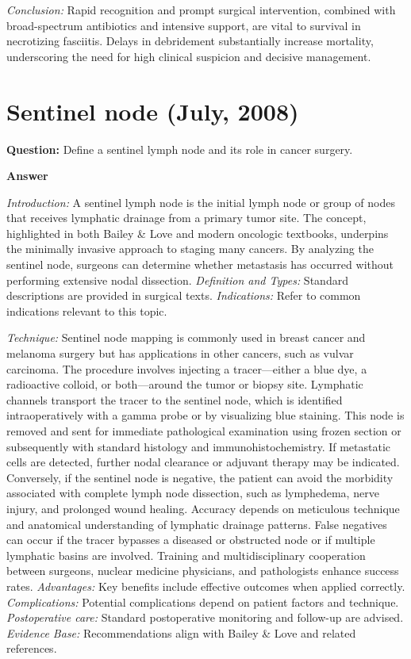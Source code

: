 \documentclass{article}
\begin{document}
\emph{Conclusion:} Rapid recognition and prompt surgical intervention, combined with broad-spectrum antibiotics and intensive support, are vital to survival in necrotizing fasciitis. Delays in debridement substantially increase mortality, underscoring the need for high clinical suspicion and decisive management.


\section{Sentinel node (July, 2008)}

\textbf{Question:} Define a sentinel lymph node and its role in cancer surgery.

\textbf{Answer}

\emph{Introduction:} A sentinel lymph node is the initial lymph node or group of nodes that receives lymphatic drainage from a primary tumor site. The concept, highlighted in both Bailey & Love and modern oncologic textbooks, underpins the minimally invasive approach to staging many cancers. By analyzing the sentinel node, surgeons can determine whether metastasis has occurred without performing extensive nodal dissection.
\emph{Definition and Types:} Standard descriptions are provided in surgical texts.
\emph{Indications:} Refer to common indications relevant to this topic.

\emph{Technique:} Sentinel node mapping is commonly used in breast cancer and melanoma surgery but has applications in other cancers, such as vulvar carcinoma. The procedure involves injecting a tracer—either a blue dye, a radioactive colloid, or both—around the tumor or biopsy site. Lymphatic channels transport the tracer to the sentinel node, which is identified intraoperatively with a gamma probe or by visualizing blue staining. This node is removed and sent for immediate pathological examination using frozen section or subsequently with standard histology and immunohistochemistry. If metastatic cells are detected, further nodal clearance or adjuvant therapy may be indicated. Conversely, if the sentinel node is negative, the patient can avoid the morbidity associated with complete lymph node dissection, such as lymphedema, nerve injury, and prolonged wound healing. Accuracy depends on meticulous technique and anatomical understanding of lymphatic drainage patterns. False negatives can occur if the tracer bypasses a diseased or obstructed node or if multiple lymphatic basins are involved. Training and multidisciplinary cooperation between surgeons, nuclear medicine physicians, and pathologists enhance success rates.
\emph{Advantages:} Key benefits include effective outcomes when applied correctly.
\emph{Complications:} Potential complications depend on patient factors and technique.
\emph{Postoperative care:} Standard postoperative monitoring and follow-up are advised.
\emph{Evidence Base:} Recommendations align with Bailey & Love and related references.
\end{document}
